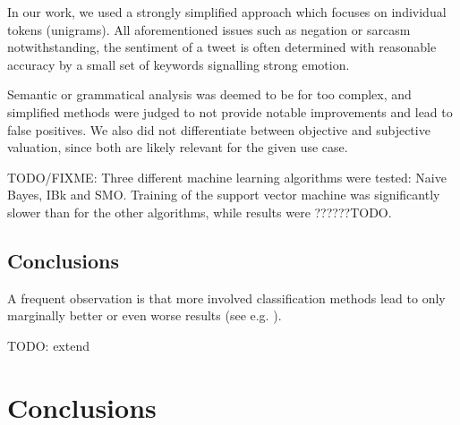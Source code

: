 \documentclass{sig-alternate}
\begin{document}
In our work, we used a strongly simplified approach which focuses on individual tokens (unigrams). All aforementioned issues such as negation or sarcasm notwithstanding, the sentiment of a tweet is often determined with reasonable accuracy by a small set of keywords signalling strong emotion.

Semantic or grammatical analysis was deemed to be for too complex, and simplified methods were judged to not provide notable improvements and lead to false positives. We also did not differentiate between objective and subjective valuation, since both are likely relevant for the given use case.

TODO/FIXME: Three different machine learning algorithms were tested: Naive Bayes, IBk and SMO. Training of the support vector machine was significantly slower than for the other algorithms, while results were ??????TODO. 

\subsection{Conclusions}

A frequent observation is that more involved classification methods lead to only marginally better or even worse results (see e.g. \cite{agarwal2011sentiment}).

TODO: extend

\section{Conclusions}


%

%
%
\end{document}
